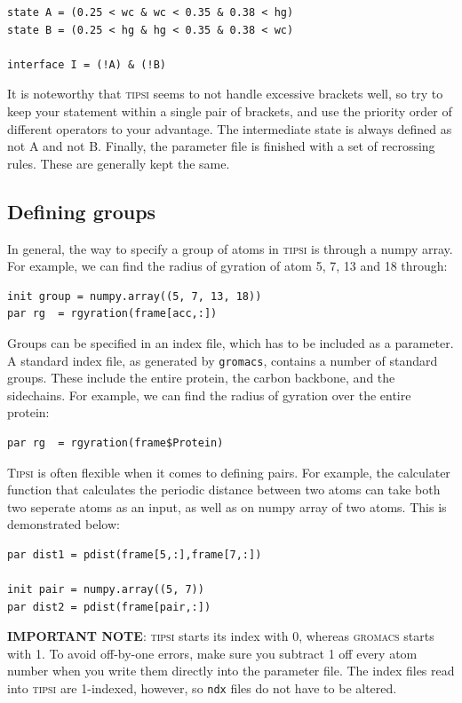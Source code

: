 \documentclass[]{article}
\begin{document}
\begin{lstlisting}
state A = (0.25 < wc & wc < 0.35 & 0.38 < hg)
state B = (0.25 < hg & hg < 0.35 & 0.38 < wc)

interface I = (!A) & (!B)
\end{lstlisting}

It is noteworthy that \textsc{tipsi} seems to not handle excessive brackets well, so try to keep your statement within a single pair of brackets, and use the priority order of different operators to your advantage.
The intermediate state is always defined as not A and not B.
Finally, the parameter file is finished with a set of recrossing rules. These are generally kept the same.

\subsection*{Defining groups}

In general, the way to specify a group of atoms in \textsc{tipsi} is through a numpy array. 
For example, we can find the radius of gyration of atom 5, 7, 13 and 18 through:

\begin{lstlisting}
init group = numpy.array((5, 7, 13, 18))
par rg  = rgyration(frame[acc,:])
\end{lstlisting}

Groups can be specified in an index file, which has to be included as a parameter. 
A standard index file, as generated by \texttt{gromacs}, contains a number of standard groups. 
These include the entire protein, the carbon backbone, and the sidechains. For example, we can find the radius of gyration over the entire protein:

\begin{lstlisting}
par rg  = rgyration(frame$Protein)
\end{lstlisting}

\textsc{Tipsi} is often flexible when it comes to defining pairs. For example, the calculater function that calculates the periodic distance between two atoms can take both two seperate atoms as an input, as well as on numpy array of two atoms. This is demonstrated below:

\begin{lstlisting}
par dist1 = pdist(frame[5,:],frame[7,:])

init pair = numpy.array((5, 7))
par dist2 = pdist(frame[pair,:]) 
\end{lstlisting}

\textbf{IMPORTANT NOTE}: \textsc{tipsi} starts its index with 0, whereas \textsc{gromacs} starts with 1. To avoid off-by-one errors, make sure you subtract 1 off every atom number when you write them directly into the parameter file. The index files read into \textsc{tipsi} are 1-indexed, however, so \texttt{ndx} files do not have to be altered.
\end{document}
